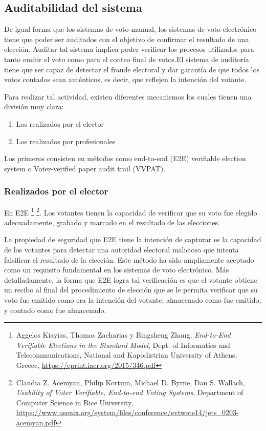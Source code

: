 \documentclass[a4,11pt]{article}
\begin{document}
\subsection{Auditabilidad del sistema}
De igual forma que los sistemas de voto manual, los sistemas de voto electrónico tiene que poder ser auditados con el objetivo de confirmar el resultado de una elección.  Auditar tal sistema implica poder verificar los procesos utilizados para tanto emitir el voto como para el conteo final de votos.El sistema de auditoría tiene que ser capaz de detectar el fraude electoral y dar garantía de que todos los votos contados sean auténticos, es decir, que reflejen la intención del votante.

Para realizar tal actividad, existen diferentes mecanismos los cuales tienen una división muy clara:
\begin{enumerate}
\item Los realizados por el elector
\item Los realizados por profesionales
\end{enumerate}
Los primeros consisten en métodos como end-to-end (E2E) verifiable election system o Voter-verified paper audit trail (VVPAT).

\subsubsection{Realizados por el elector}
En E2E \footnote{Aggelos Kiayias, Thomas Zacharias y Bingsheng Zhang, \textit{End-to-End Verifiable Elections in the Standard Model}, Dept. of Informatics and Telecommunications, National and Kapodistrian University of Athens, Greece, \url{https://eprint.iacr.org/2015/346.pdf}} \footnote{Claudia Z. Acemyan, Philip Kortum, Michael D. Byrne, Dan S. Wallach, \textit{Usability of Voter Verifiable, End-to-end Voting Systems}, Department of Computer Science in Rice University, \url{https://www.usenix.org/system/files/conference/evtwote14/jets_0203-acemyan.pdf}}. Los votantes tienen la capacidad de verificar que su voto fue elegido adecuadamente, grabado y marcado en el resultado de las elecciones.

La propiedad de seguridad que E2E tiene la intención de capturar es la capacidad de los votantes para detectar una autoridad electoral malicioso que intenta falsificar el resultado de la elección. Este método ha sido ampliamente aceptado como un requisito fundamental en los sistemas de voto electrónico. Más detalladamente, la forma que E2E logra tal verificación es que el votante obtiene un recibo al final del procedimiento de elección que se le permita verificar que su voto fue emitido como era la intención del votante, almacenado como fue emitido, y contado como fue almacenado.
\end{document}
